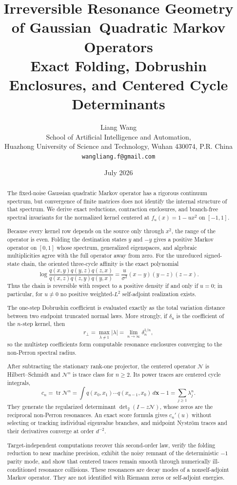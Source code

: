 \documentclass[11pt]{article}
\title{\textbf{Irreversible Resonance Geometry of Gaussian}\
\textbf{Quadratic Markov Operators}\\
\large Exact Folding, Dobrushin Enclosures, and Centered Cycle Determinants}
\author{Liang Wang\\
\small School of Artificial Intelligence and Automation,\\[-0.2em]
\small Huazhong University of Science and Technology, Wuhan 430074, P.R. China\\
\small \texttt{wangliang.f@gmail.com}}
\date{July 2026}
\theoremstyle{definition}
\theoremstyle{remark}
\newcommand{\cN}{\mathcal N}
\newcommand{\tr}{\operatorname{tr}}
\begin{document}
\maketitle

\begin{abstract}
The fixed-noise Gaussian quadratic Markov operator has a rigorous continuum
spectrum, but convergence of finite matrices does not identify the internal
structure of that spectrum.  We derive exact reductions, contraction
enclosures, and branch-free spectral invariants for the normalized kernel
centered at $f_u(x)=1-u x^2$ on $[-1,1]$.

Because every kernel row depends on the source only through $x^2$, the range
of the operator is even.  Folding the destination states $y$ and $-y$ gives a
positive Markov operator on $[0,1]$ whose spectrum, generalized eigenspaces,
and algebraic multiplicities agree with the full operator away from zero.
For the unreduced signed-state chain, the oriented three-cycle affinity is
the exact polynomial
\[
 \log\frac{q(x,y)q(y,z)q(z,x)}{q(x,z)q(z,y)q(y,x)}
 =\frac{u}{\sigma^2}(x-y)(y-z)(z-x).
\]
Thus the chain is reversible with respect to a positive density if and only
if $u=0$; in particular, for $u\ne0$ no positive weighted-$L^2$
self-adjoint realization exists.

The one-step Dobrushin coefficient is evaluated exactly as the total
variation distance between two endpoint truncated normal laws.  More
strongly, if $\delta_n$ is the coefficient of the $n$-step kernel, then
\[
 r_\perp=\max_{\lambda\ne1}|\lambda|
 =\lim_{n\to\infty}\delta_n^{1/n},
\]
so the multistep coefficients form computable resonance enclosures converging
to the non-Perron spectral radius.

After subtracting the stationary rank-one projector, the centered operator
$\cN$ is Hilbert--Schmidt and $\cN^n$ is trace class for $n\ge2$.  Its power
traces are centered cycle integrals,
\[
 c_n=\tr\cN^n
 =\int q(x_0,x_1)\cdots q(x_{n-1},x_0)\,d\boldsymbol{x}-1
 =\sum_{j\ge1}\lambda_j^n.
\]
They generate the regularized determinant $\det_2(I-z\cN)$, whose zeros are
the reciprocal non-Perron resonances.  An exact score formula gives $c_n'(u)$
without selecting or tracking individual eigenvalue branches, and midpoint
Nystr\"om traces and their derivatives converge at order $d^{-2}$.

Target-independent computations recover this second-order law, verify the
folding reduction to near machine precision, exhibit the noisy remnant of the
deterministic $-1$ parity mode, and show that centered traces remain smooth
through numerically ill-conditioned resonance collisions.  These resonances
are decay modes of a nonself-adjoint Markov operator.  They are not identified
with Riemann zeros or self-adjoint energies.
\end{abstract}
\end{document}
